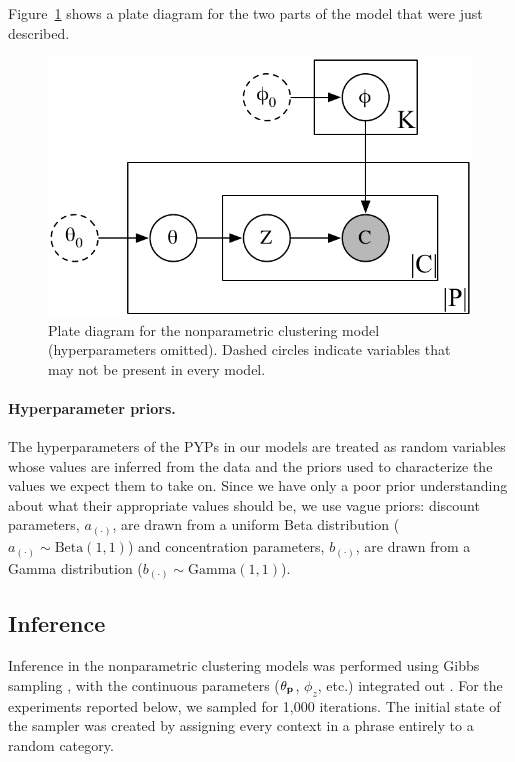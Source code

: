 \noindent Figure~\ref{fig:np_plate} shows a plate diagram for the two parts of the model that were just described.

\begin{figure}
\begin{center}
\includegraphics[scale=0.75]{pyp_clustering/np_plate.pdf}
\vspace{-0.3cm}
\end{center}
\caption{Plate diagram for the nonparametric clustering model (hyperparameters omitted).  Dashed circles indicate variables that may not be present in every model.}
\label{fig:np_plate}
\end{figure}

\paragraph{Hyperparameter priors.} The hyperparameters of the PYPs in our models are treated as random variables whose values are inferred from the data and the priors used to characterize the values we expect them to take on.  Since we have only a poor prior understanding about what their appropriate values should be, we use vague priors: discount parameters, $a_{(\cdot)}$, are drawn from a uniform Beta distribution ($a_{(\cdot)} \sim \textrm{Beta}(1,1)$) and concentration parameters, $b_{(\cdot)}$, are drawn from a Gamma distribution ($b_{(\cdot)} \sim \textrm{Gamma}(1,1)$).

\subsection{Inference}

Inference in the nonparametric clustering models was performed using Gibbs sampling \citep{geman:1984}, with the continuous parameters ($\theta_{\textbf{p}}$, $\phi_z$, etc.) integrated out \citep{blunsom:2009}.  For the experiments reported below, we sampled for 1,000 iterations.  The initial state of the sampler was created by assigning every context in a phrase entirely to a random category.

